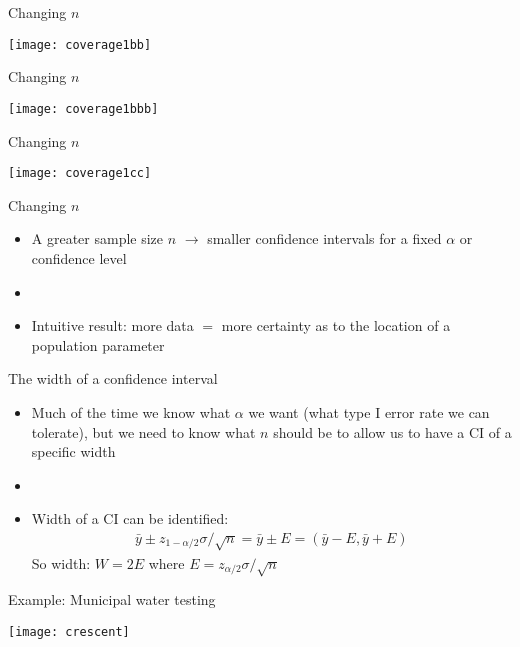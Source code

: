 \documentclass[xcolor=dvipsnames]{beamer}
\begin{document}
\begin{frame}{Changing $n$}
\begin{center}
	\texttt{[image: coverage1bb]}
\end{center}
\end{frame}

\begin{frame}{Changing $n$}
\begin{center}
	\texttt{[image: coverage1bbb]}
\end{center}
\end{frame}

\begin{frame}{Changing $n$}
\begin{center}
	\texttt{[image: coverage1cc]}
\end{center}
\end{frame}

\begin{frame}{Changing $n$}
\begin{itemize}
		\item A greater sample size $n$ $\rightarrow$ smaller confidence intervals for a fixed $\alpha$ or confidence level
	\item[]
	\item Intuitive result: more data $=$ more certainty as to the location of a population parameter
\end{itemize}
\end{frame}

\begin{frame}{The width of a confidence interval}
	\begin{itemize}
		\item Much of the time we know what $\alpha$ we want (what type I error rate we can tolerate), but we need to know what $n$ should be to allow us to have a CI of a specific width
		\item[]
		\item Width of a CI can be identified:
		\begin{align*}
			\bar{y}\pm z_{1-\alpha/2} \sigma / \sqrt{n} = \bar{y} \pm E = (\bar{y}-E, \bar{y}+E)
		\end{align*}
		So width: $W = 2E$ where $E = z_{\alpha/2} \sigma  /\sqrt{n}$
	\end{itemize}
\end{frame}

\begin{frame}{Example: Municipal water testing}
	\begin{center}
		\texttt{[image: crescent]}
	\end{center}
\end{frame}
\end{document}
